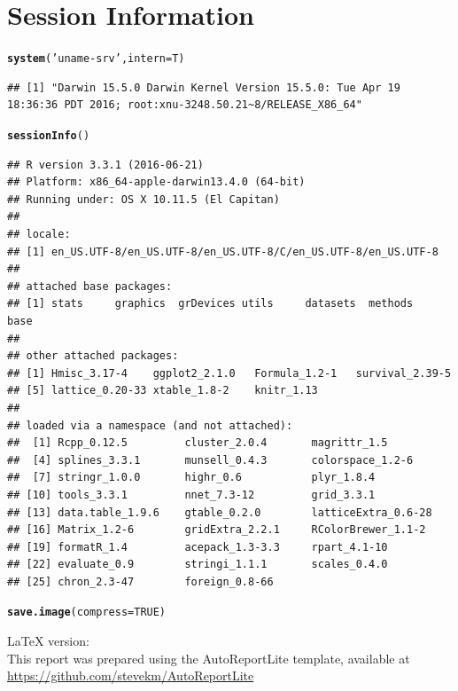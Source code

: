 \documentclass[8pt]{beamer}\usepackage[]{graphicx}\usepackage[]{color}
\makeatletter
\newcommand{\hlnum}[1]{\textcolor[rgb]{0.686,0.059,0.569}{#1}}%
\newcommand{\hlstr}[1]{\textcolor[rgb]{0.192,0.494,0.8}{#1}}%
\newcommand{\hlstd}[1]{\textcolor[rgb]{0.345,0.345,0.345}{#1}}%
\newcommand{\hlkwc}[1]{\textcolor[rgb]{0.333,0.667,0.333}{#1}}%
\newcommand{\hlkwd}[1]{\textcolor[rgb]{0.737,0.353,0.396}{\textbf{#1}}}%
\newenvironment{kframe}{%
 \def\at@end@of@kframe{}%
 \ifinner\ifhmode%
  \def\at@end@of@kframe{\end{minipage}}%
  \begin{minipage}{\columnwidth}%
 \fi\fi%
 \def\FrameCommand##1{\hskip\@totalleftmargin \hskip-\fboxsep
 \colorbox{shadecolor}{##1}\hskip-\fboxsep
     \hskip-\linewidth \hskip-\@totalleftmargin \hskip\columnwidth}%
 \MakeFramed {\advance\hsize-\width
   \@totalleftmargin\z@ \linewidth\hsize
   \@setminipage}}%
 {\par\unskip\endMakeFramed%
 \at@end@of@kframe}
\newenvironment{knitrout}{}{} %
\makeatother
\begin{document}
\section{Session Information}
\begin{knitrout}\footnotesize
{}\color{fgcolor}\begin{kframe}
\begin{alltt}
\hlkwd{system}\hlstd{(}\hlstr{'uname -srv'}\hlstd{,}\hlkwc{intern}\hlstd{=T)}
\end{alltt}
\begin{verbatim}
## [1] "Darwin 15.5.0 Darwin Kernel Version 15.5.0: Tue Apr 19 18:36:36 PDT 2016; root:xnu-3248.50.21~8/RELEASE_X86_64"
\end{verbatim}
\begin{alltt}
\hlkwd{sessionInfo}\hlstd{()}
\end{alltt}
\begin{verbatim}
## R version 3.3.1 (2016-06-21)
## Platform: x86_64-apple-darwin13.4.0 (64-bit)
## Running under: OS X 10.11.5 (El Capitan)
## 
## locale:
## [1] en_US.UTF-8/en_US.UTF-8/en_US.UTF-8/C/en_US.UTF-8/en_US.UTF-8
## 
## attached base packages:
## [1] stats     graphics  grDevices utils     datasets  methods   base     
## 
## other attached packages:
## [1] Hmisc_3.17-4    ggplot2_2.1.0   Formula_1.2-1   survival_2.39-5
## [5] lattice_0.20-33 xtable_1.8-2    knitr_1.13     
## 
## loaded via a namespace (and not attached):
##  [1] Rcpp_0.12.5         cluster_2.0.4       magrittr_1.5       
##  [4] splines_3.3.1       munsell_0.4.3       colorspace_1.2-6   
##  [7] stringr_1.0.0       highr_0.6           plyr_1.8.4         
## [10] tools_3.3.1         nnet_7.3-12         grid_3.3.1         
## [13] data.table_1.9.6    gtable_0.2.0        latticeExtra_0.6-28
## [16] Matrix_1.2-6        gridExtra_2.2.1     RColorBrewer_1.1-2 
## [19] formatR_1.4         acepack_1.3-3.3     rpart_4.1-10       
## [22] evaluate_0.9        stringi_1.1.1       scales_0.4.0       
## [25] chron_2.3-47        foreign_0.8-66
\end{verbatim}
\begin{alltt}
\hlkwd{save.image}\hlstd{(}\hlkwc{compress} \hlstd{=} \hlnum{TRUE}\hlstd{)}
\end{alltt}
\end{kframe}
\end{knitrout}
\scriptsize{\LaTeX{} version: \LaTeXe~ \fmtversion} \\
\scriptsize{This report was prepared using the AutoReportLite template, available at \url{https://github.com/stevekm/AutoReportLite}}

\end{document}
